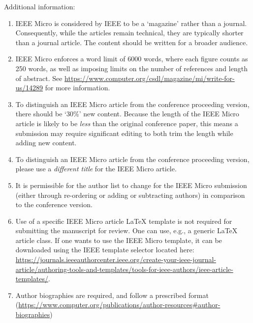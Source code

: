 \documentclass{article}
\begin{document}
\noindent Additional information:
\begin{enumerate}
\item IEEE Micro is considered by IEEE to be a `magazine' rather than a journal. Consequently, while the 
articles remain technical, they are typically shorter than a journal article. The content should be written for a broader audience.
\item IEEE Micro enforces a word limit of 6000 words, where each figure counts as 
250 words, as well as imposing limits on the number of references and length of 
abstract. See \url{https://www.computer.org/csdl/magazine/mi/write-for-us/14289} for more information.
\item To distinguish an IEEE Micro article from the conference proceeding version, 
there should be `30\%' new content. Because the length of the IEEE Micro article is 
likely to be \emph{less} than the original conference paper, this means a submission may 
require significant editing to both trim the length while adding new content. 
\item To distinguish an IEEE Micro article from the conference proceeding version, please 
use a \emph{different title} for the IEEE Micro article.
\item It is permissible for the author list to change for the IEEE Micro submission 
(either through re-ordering or adding or subtracting authors) in comparison to the 
conference version.
\item Use of a specific IEEE Micro article LaTeX template is not required for submitting 
the manuscript for review. One can use, e.g., a generic LaTeX article class. If one wants 
to use the IEEE Micro template, it can be downloaded using the IEEE template selector 
located here: \url{https://journals.ieeeauthorcenter.ieee.org/create-your-ieee-journal-article/authoring-tools-and-templates/tools-for-ieee-authors/ieee-article-templates/}.
\item Author biographies are required, and follow a prescribed format (\url{https://www.computer.org/publications/author-resources#author-biographies})


\end{enumerate}
\end{document}
